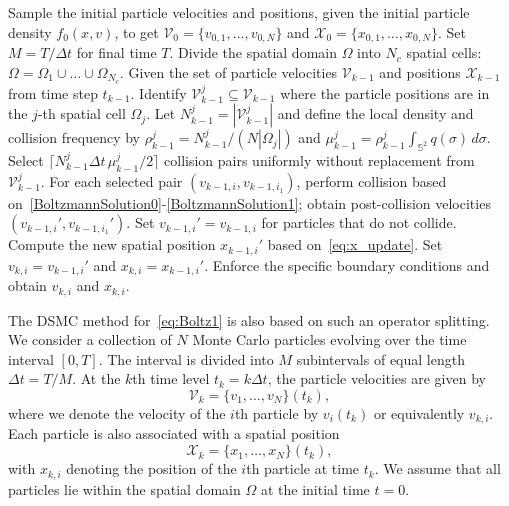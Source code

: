 \documentclass[12pt,nopreprintline]{elsarticle}
\begin{document}
\begin{algorithm}
  \caption{Nanbu--Babovsky Algorithm for Maxwell Molecules\label{alg:DSMC}}
  {
\begin{algorithmic}[1]
\State Sample the initial particle velocities and positions, given the initial particle density $f_0(x,v)$, to get $\mathcal V_0 = \{v_{0,1},\dots,v_{0,N}\}$ and $\mathcal X_0 = \{x_{0,1},\dots,x_{0,N}\}$. Set $M=T/\Delta t$ for final time $T$. Divide the spatial domain $\Omega$ into $N_c$ spatial cells: $\Omega = \Omega_1 \cup \ldots  \cup  \Omega_{N_c}$.
\State  Given the set of particle velocities $\mathcal V_{k-1}$ and positions $\mathcal X_{k-1}$ from time step $t_{k-1}$.
\State Identify $\mathcal V_{k-1}^j \subseteq \mathcal V_{k-1}$ where the particle positions are in the $j$-th spatial cell $\Omega_j$.
\State Let $N^j_{k-1}=|\mathcal V_{k-1}^j|$ and define the local density and collision frequency by $\rho_{k-1}^j= N_{k-1}^j/(N|\Omega_j|)$ and $
\mu_{k-1}^j=\rho_{k-1}^j \int_{\mathbb S^2}q(\sigma)\,d\sigma$.
Select $\lceil
N_{k-1}^j\Delta t\,\mu_{k-1}^j/2 \rceil$ collision pairs uniformly without replacement from
$\mathcal V_{k-1}^j$.
\State For each selected pair $(v_{k-1,i},  v_{k-1,i_1})$, perform collision based on~\eqref{BoltzmannSolution0}-\eqref{BoltzmannSolution1}; obtain post-collision velocities $( v_{k-1,i}',  v_{k-1,i_1}')$. Set $v_{k-1,i}' = {v}_{k-1,i}$ for particles that do not collide.
\EndFor
\State Compute the new spatial position $x_{k-1,i}'$ based on~\eqref{eq:x_update}.
\State Set $v_{k,i} = v_{k-1,i}'$ and $x_{k,i} = x_{k-1,i}'$.
\Else
\State Enforce the specific boundary conditions and obtain $v_{k,i}$ and $x_{k,i}$.
\EndIf
\EndFor
\end{algorithmic}
}
\end{algorithm}

The DSMC method for~\eqref{eq:Boltz1} is also based on such an operator splitting. We consider a collection of $N$ Monte Carlo particles evolving over the time interval $[0,T]$. The interval is divided into $M$ subintervals of equal length $\Delta t = T/M$. At the $k$th time level $t_k = k \Delta t$, the particle velocities are given by
\begin{equation}
\label{eq:vk}
\mathcal V_k = \{ v_1, \ldots, v_N \}(t_k),
\end{equation}
where we denote the velocity of the $i$th particle by $v_i(t_k)$ or equivalently $v_{k,i}$. Each particle is also associated with a spatial position
\begin{equation}
\label{eq:xk}
\mathcal X_k = \{ x_1, \ldots, x_N \}(t_k),
\end{equation}
with $x_{k,i}$ denoting the position of the $i$th particle at time $t_k$. We assume that all particles lie within the spatial domain $\Omega$ at the initial time $t=0$.
\end{document}
